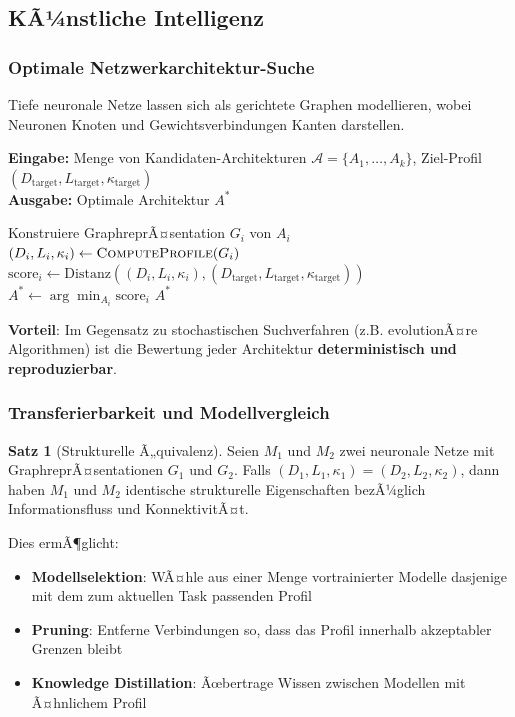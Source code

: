 ﻿\documentclass[a4paper,12pt]{article}
\theoremstyle{definition}
\newtheorem{satz}{Satz}
\begin{document}
	\subsection{KÃ¼nstliche Intelligenz}

	\subsubsection{Optimale Netzwerkarchitektur-Suche}

	Tiefe neuronale Netze lassen sich als gerichtete Graphen modellieren, wobei Neuronen Knoten und Gewichtsverbindungen Kanten darstellen.
	
	\begin{algorithm}[H]
		\caption{Profilbasierte Neural Architecture Search}
		\label{alg:nas}
		\textbf{Eingabe:} Menge von Kandidaten-Architekturen $\mathcal{A} = \{A_1, \ldots, A_k\}$, Ziel-Profil $(D_{\text{target}}, L_{\text{target}}, \kappa_{\text{target}})$ \\
		\textbf{Ausgabe:} Optimale Architektur $A^*$
		\begin{algorithmic}[1]
			\State Konstruiere GraphreprÃ¤sentation $G_i$ von $A_i$
			\State $(D_i, L_i, \kappa_i) \gets \textsc{ComputeProfile}(G_i)$
			\State $\text{score}_i \gets \text{Distanz}((D_i, L_i, \kappa_i), (D_{\text{target}}, L_{\text{target}}, \kappa_{\text{target}}))$
			\EndFor
			\State $A^* \gets \arg\min_{A_i} \text{score}_i$
			\State \Return $A^*$
		\end{algorithmic}
	\end{algorithm}
	
	\textbf{Vorteil}: Im Gegensatz zu stochastischen Suchverfahren (z.B. evolutionÃ¤re Algorithmen) ist die Bewertung jeder Architektur \textbf{deterministisch und reproduzierbar}.
	
	\subsubsection{Transferierbarkeit und Modellvergleich}
	
	\begin{satz}[Strukturelle Ã„quivalenz]
		Seien $M_1$ und $M_2$ zwei neuronale Netze mit GraphreprÃ¤sentationen $G_1$ und $G_2$. Falls $(D_1, L_1, \kappa_1) = (D_2, L_2, \kappa_2)$, dann haben $M_1$ und $M_2$ identische strukturelle Eigenschaften bezÃ¼glich Informationsfluss und KonnektivitÃ¤t.
	\end{satz}
	
	Dies ermÃ¶glicht:
	\begin{itemize}
		\item[-] \textbf{Modellselektion}: WÃ¤hle aus einer Menge vortrainierter Modelle dasjenige mit dem zum aktuellen Task passenden Profil
		\item[-] \textbf{Pruning}: Entferne Verbindungen so, dass das Profil innerhalb akzeptabler Grenzen bleibt
		\item[-] \textbf{Knowledge Distillation}: Ãœbertrage Wissen zwischen Modellen mit Ã¤hnlichem Profil
	\end{itemize}
	
\end{document}
